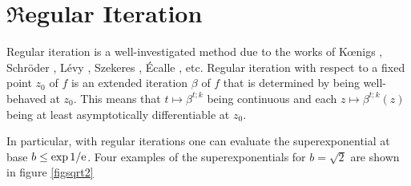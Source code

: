 \documentclass{article}
\numberwithin{equation}{section}
\begin{document}
\section{${\mathfrak{R}}$egular Iteration}
Regular iteration is a well-investigated method due to the works of
Kœnigs \cite{MR1508749}, Schröder \cite{ref02.0042.02}, Lévy
\cite{levy:fonctions}, Szekeres
\cite{szekeres:regular}, Écalle \cite{Ecalle:InvariantsHolomorphes}, etc. 
Regular iteration with respect to a fixed point $z_0$ of $f$ is an
extended iteration $\beta$ of $f$ that is determined by being well-behaved at
$z_0$.
This means that $t\mapsto \beta^{t;k}$ being continuous
and each $z\mapsto \beta^{t;k}(z)$ being at least asymptotically
differentiable at $z_0$. 

In particular, with regular iterations one can evaluate the 
superexponential at base $b\le\exp{1/\mathrm{e}}$. Four examples of the 
superexponentials for $b=\sqrt{2}$ are shown in figure \ref{figsqrt2}
\end{document}
